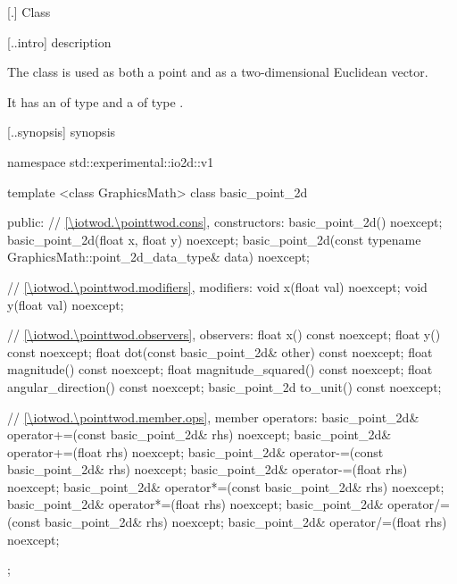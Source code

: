  [\iotwod.\pointtwod] {Class }

 [\iotwod.\pointtwod.intro] { description}

%
\pnum
The class  is used as both a point and as a two-dimensional Euclidean vector.

\pnum
It has an  of type  and a  of type .

 [\iotwod.\pointtwod.synopsis] { synopsis}

\begin{codeblock}
namespace std::experimental::io2d::v1 {
  template <class GraphicsMath>
  class basic_point_2d {
  public:
    // \ref{\iotwod.\pointtwod.cons}, constructors:
    basic_point_2d() noexcept;
    basic_point_2d(float x, float y) noexcept;
    basic_point_2d(const typename GraphicsMath::point_2d_data_type& data) noexcept;

    // \ref{\iotwod.\pointtwod.modifiers}, modifiers:
    void x(float val) noexcept;
    void y(float val) noexcept;

    // \ref{\iotwod.\pointtwod.observers}, observers:
    float x() const noexcept;
    float y() const noexcept;
    float dot(const basic_point_2d& other) const noexcept;
    float magnitude() const noexcept;
    float magnitude_squared() const noexcept;
    float angular_direction() const noexcept;
    basic_point_2d to_unit() const noexcept;

    // \ref{\iotwod.\pointtwod.member.ops}, member operators:
    basic_point_2d& operator+=(const basic_point_2d& rhs) noexcept;
    basic_point_2d& operator+=(float rhs) noexcept;
    basic_point_2d& operator-=(const basic_point_2d& rhs) noexcept;
    basic_point_2d& operator-=(float rhs) noexcept;
    basic_point_2d& operator*=(const basic_point_2d& rhs) noexcept;
    basic_point_2d& operator*=(float rhs) noexcept;
    basic_point_2d& operator/=(const basic_point_2d& rhs) noexcept;
    basic_point_2d& operator/=(float rhs) noexcept;
  };

}
\end{codeblock}
